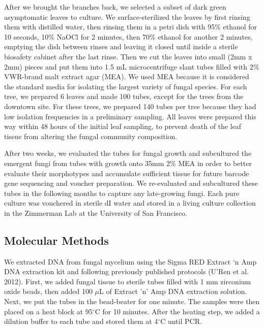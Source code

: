 \documentclass[fleqn,10pt,lineno]{wlpeerj} %
\begin{document}
After we brought the branches back, we selected a subset of dark green asymptomatic leaves to culture. We surface-sterilized the leaves by first rinsing them with distilled water, then rinsing them in a petri dish with 95\% ethanol for 10 seconds, 10\% NaOCl for 2 minutes, then 70\% ethanol for another 2 minutes, emptying the dish between rinses and leaving it closed until inside a sterile biosafety cabinet after the last rinse. Then we cut the leaves into small (2mm x 2mm) pieces and put them into 1.5 mL microcentrifuge slant tubes filled with 2\% VWR-brand malt extract agar (MEA). We used MEA because it is considered the standard media for isolating the largest variety of fungal species. For each tree, we prepared 6 leaves and made 100 tubes, except for the trees from the downtown site. For these trees, we prepared 140 tubes per tree because they had low isolation frequencies in a preliminary sampling. All leaves were prepared this way within 48 hours of the initial leaf sampling, to prevent death of the leaf tissue from altering the fungal community composition.

After two weeks, we evaluated the tubes for fungal growth and subcultured the emergent fungi from tubes with growth onto 35mm 2\% MEA in order to better evaluate their morphotypes and accumulate sufficient tissue for future barcode gene sequencing and voucher preparation. We re-evaluated and subcultured these tubes in the following months to capture any late-growing fungi. Each pure culture was vouchered in sterile dI water and stored in a living culture collection in the Zimmerman Lab at the University of San Francisco.

\hypertarget{molecular-methods}{%
\subsection*{Molecular Methods}\label{molecular-methods}}

We extracted DNA from fungal mycelium using the Sigma RED Extract `n Amp DNA extraction kit and following previously published protocols (U'Ren et al. 2012). First, we added fungal tissue to sterile tubes filled with 1 mm zirconium oxide beads, then added 100 \(\mu\)L of Extract 'n' Amp DNA extraction solution. Next, we put the tubes in the bead-beater for one minute. The samples were then placed on a heat block at 95\(^{\circ}\)C for 10 minutes. After the heating step, we added a dilution buffer to each tube and stored them at 4\(^{\circ}\)C until PCR.
\end{document}
